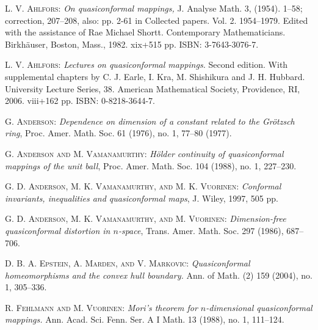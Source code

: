 \documentclass[12pt,a4paper,leqno]{amsart}
\theoremstyle{plain}
\numberwithin{equation}{section}          %
\begin{document}

\vskip 2cm

\begin{thebibliography}{AVV2}

 \textsc{L. V.
Ahlfors}: {\it On quasiconformal mappings,} J. Analyse Math. 3,
(1954). 1--58; correction, 207--208, also:
pp. 2-61 in Collected papers. Vol. 2. 1954--1979.
Edited with the assistance of Rae Michael Shortt.
Contemporary Mathematicians. Birkh\"auser, Boston, Mass.,
1982. xix+515 pp. ISBN: 3-7643-3076-7.





 \textsc{L. V.
Ahlfors}: {\it Lectures on quasiconformal mappings.} Second edition.
With supplemental chapters by C. J. Earle, I. Kra, M. Shishikura and
J. H. Hubbard. University Lecture Series, 38. American Mathematical
Society, Providence, RI, 2006. viii+162 pp. ISBN: 0-8218-3644-7.

 \textsc{G. Anderson}: {\it Dependence on dimension
of a constant related to the Gr\"otzsch ring},
 Proc. Amer. Math. Soc. 61 (1976), no. 1, 77--80 (1977).



 \textsc{G. Anderson and M. Vamanamurthy}:
{\it H\"older continuity of quasiconformal mappings of the unit ball},
Proc. Amer. Math. Soc.  104  (1988),  no. 1, 227--230.

\textsc{G. D. Anderson, M. K. Vamanamurthy, and M. K. Vuorinen}:
\textit{ Conformal invariants, inequalities and quasiconformal
maps},  J. Wiley, 1997, 505 pp.

\textsc{G. D. Anderson, M. K. Vamanamurthy, and M. Vuorinen}: {\it Dimension-free
quasiconformal distortion in $n$-space},  Trans. Amer. Math. Soc. 297 (1986),
687--706.



\textsc{D. B. A. Epstein, A. Marden, and V. Markovic}: {\it
Quasiconformal homeomorphisms and the convex hull boundary.} Ann. of
Math. (2) 159 (2004), no. 1, 305--336.

 \textsc{R. Fehlmann and M. Vuorinen}:
\textit{ Mori's theorem for $n$-dimensional quasiconformal mappings. }
Ann. Acad. Sci. Fenn. Ser. A I Math. 13 (1988), no. 1, 111--124.



\end{thebibliography}
\end{document}
